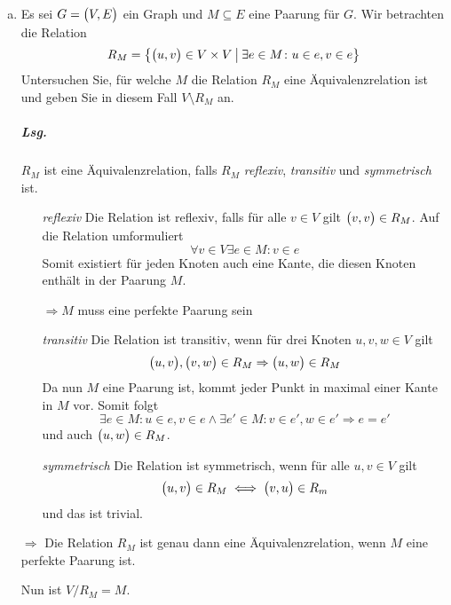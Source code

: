 \documentclass{scrreprt}
\begin{document}
\begin{enumerate}[(a)]
\item Es sei $G = \qty\big(V, E)$ ein Graph und $M \subseteq E$ eine Paarung für
  $G$.
  Wir betrachten die Relation
  \[
    R_M = \qty{\qty\big(u, v) \in V \times V \:\middle|\: \exists e \in M \colon u \in e, v \in e}
  \]
  Untersuchen Sie, für welche $M$ die Relation $R_M$ eine Äquivalenzrelation ist
  und geben Sie in diesem Fall $V \setminus R_M$ an.

  \subparagraph{Lsg.} $R_M$ ist eine Äquivalenzrelation, falls $R_M$
  \emph{reflexiv}, \emph{transitiv} und \emph{symmetrisch} ist.

  \begin{itemize}
  \item[\emph{reflexiv}] Die Relation ist reflexiv, falls für alle $v \in V$ gilt
    $\qty\big(v, v) \in R_M$.
    Auf die Relation umformuliert
    \[
      \forall v \in V \exists e \in M \colon v \in e
    \]
    Somit existiert für jeden Knoten auch eine Kante, die diesen Knoten enthält
    in der Paarung $M$.

    $\Rightarrow M$ muss eine perfekte Paarung sein

  \item[\emph{transitiv}] Die Relation ist transitiv, wenn für drei Knoten
    $u, v, w \in V$ gilt
    \[
      \qty\big(u, v), \qty\big(v, w) \in R_M \Rightarrow \qty\big(u, w) \in R_M
    \]
    Da nun $M$ eine Paarung ist, kommt jeder Punkt in maximal einer Kante in $M$
    vor.
    Somit folgt
    \[
      \exists e \in M \colon u \in e, v \in e \land
      \exists e' \in M \colon v \in e', w \in e'
      \Rightarrow e = e'
    \]
    und auch $\qty\big(u, w) \in R_M$.

  \item[\emph{symmetrisch}] Die Relation ist symmetrisch, wenn für alle
    $u, v \in V$ gilt
    \[
      \qty\big(u,v) \in R_M \iff \qty\big(v,u) \in R_m
    \]
    und das ist trivial.
  \end{itemize}

  $\Rightarrow$ Die Relation $R_M$ ist genau dann eine Äquivalenzrelation, wenn
  $M$ eine perfekte Paarung ist.

  Nun ist $V / R_M = M$.
\end{enumerate}
\end{document}
